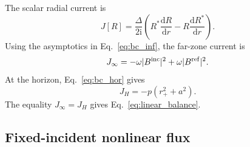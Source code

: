 \documentclass[aps,prd,twocolumn,10pt,nofootinbib,superscriptaddress,floatfix]{revtex4-2}
\newcommand{\dd}{\mathrm{d}}
\newcommand{\ii}{\mathrm{i}}
\newcommand{\rp}{r_+}
\newcommand{\Bin}{B^{\rm inc}}
\newcommand{\Bref}{B^{\rm ref}}
\newcommand{\DeltaK}{\Delta}
\begin{document}
The scalar radial current is
\begin{equation}
J[R]=\frac{\DeltaK}{2\ii}
\left(R^*\frac{\dd R}{\dd r}-R\frac{\dd R^*}{\dd r}\right).
\end{equation}
Using the asymptotics in Eq.~\eqref{eq:bc_inf}, the far-zone current is
\begin{equation}
J_\infty=-\omega|\Bin|^2+\omega|\Bref|^2 .
\end{equation}
At the horizon, Eq.~\eqref{eq:bc_hor} gives
\begin{equation}
J_H=-p(\rp^2+a^2).
\end{equation}
The equality $J_\infty=J_H$ gives
Eq.~\eqref{eq:linear_balance}.

\subsection{Fixed-incident nonlinear flux}
\end{document}
